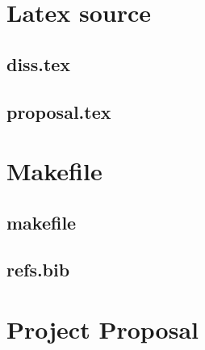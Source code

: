 \documentclass[12pt,a4paper,twoside,openright]{report}
\begin{document}
\chapter{Latex source}
\section{diss.tex}
{\scriptsize}
\section{proposal.tex}
{\scriptsize}
\chapter{Makefile}
\section{makefile}\label{makefile}
{\scriptsize}
\section{refs.bib}
{\scriptsize}
\chapter{Project Proposal}

\end{document}
